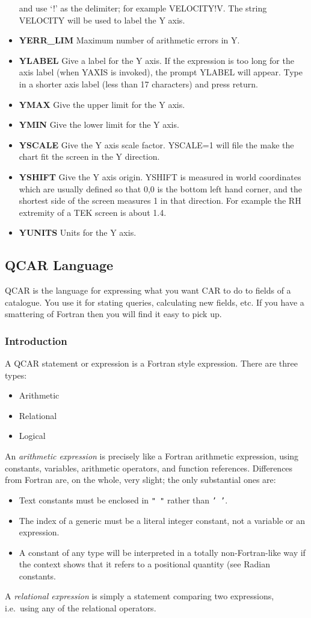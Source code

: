 \begin{itemize}
and use `!' as the delimiter; for example VELOCITY!V.
The string VELOCITY will be used to label the Y axis.
\item{\bf YERR\_LIM} Maximum number of arithmetic errors in Y.
\item{\bf YLABEL} Give a label for the Y axis.
If the expression is too long for the axis label (when YAXIS is invoked),
the prompt YLABEL will appear.
Type in a shorter axis label (less than 17 characters) and press return.
\item{\bf YMAX} Give the upper limit for the Y axis.
\item{\bf YMIN} Give the lower limit for the Y axis.
\item{\bf YSCALE} Give the Y axis scale factor.
YSCALE=1 will file the make the chart fit the screen in the Y direction.
\item{\bf YSHIFT} Give the Y axis origin.
YSHIFT is measured in world coordinates which are usually defined so that
0,0 is the bottom left hand corner, and the shortest side of the screen
measures 1 in that direction.
For example the RH extremity of a TEK screen is about 1.4.
\item{\bf YUNITS} Units for the Y axis.
\end{itemize}

\subsection {QCAR Language}

QCAR is the language for expressing what you want CAR to do to fields of a
catalogue.
You use it for stating queries, calculating new fields, etc.
If you have a smattering of Fortran then you will find it easy to pick up.
\subsubsection {Introduction}
A QCAR statement or expression is a Fortran style expression.
There are  three types:
\begin{itemize}
\item Arithmetic
\item Relational
\item Logical
\end{itemize}
An {\em arithmetic expression} is precisely like a Fortran arithmetic
expression, using constants, variables, arithmetic operators, and function
references.
Differences from Fortran are, on the whole, very slight; the only substantial
ones are:
\begin{itemize}
\item Text constants must be enclosed in {\tt " "} rather than {\tt ' '}.
\item The index of a generic must be a literal integer constant, not
a variable or an expression.
\item A constant of any type will be interpreted in a totally non-Fortran-like
way if the context shows that it refers to a positional quantity (see Radian
constants.
\end{itemize}
A {\em relational expression} is simply a statement comparing two expressions,
i.e.\ using any of the relational operators.

